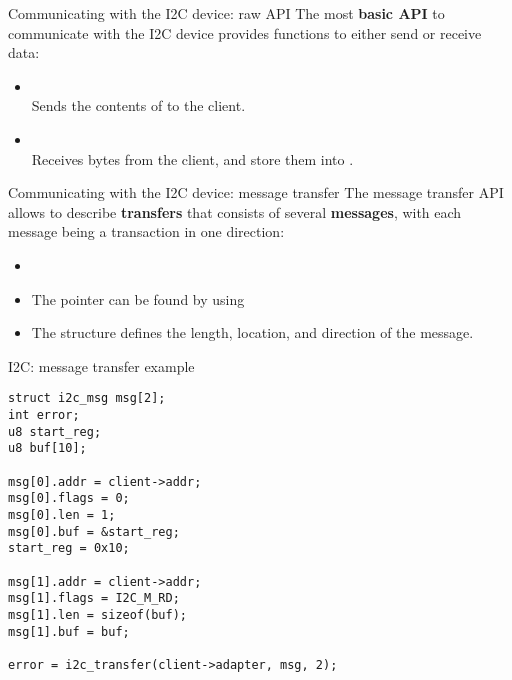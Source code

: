 \begin{frame}{Communicating with the I2C device: raw API}
  The most {\bf basic API} to communicate with the I2C device provides
  functions to either send or receive data:
  \begin{itemize}
  \item
    \\Sends
    the contents of  to the client.
  \item
    \\Receives
     bytes from the client, and store them into
    .
  \end{itemize}
\end{frame}

\begin{frame}{Communicating with the I2C device: message transfer}
  The message transfer API allows to describe {\bf transfers} that
  consists of several {\bf messages}, with each message being a
  transaction in one direction:
  \begin{itemize}
  \item
  \item The  pointer can be found by using
  \item The  structure defines the length, location, and
    direction of the message.
  \end{itemize}
\end{frame}

\begin{frame}[fragile]{I2C: message transfer example}
\begin{block}{}
  \begin{verbatim}
struct i2c_msg msg[2];
int error;
u8 start_reg;
u8 buf[10];

msg[0].addr = client->addr;
msg[0].flags = 0;
msg[0].len = 1;
msg[0].buf = &start_reg;
start_reg = 0x10;

msg[1].addr = client->addr;
msg[1].flags = I2C_M_RD;
msg[1].len = sizeof(buf);
msg[1].buf = buf;

error = i2c_transfer(client->adapter, msg, 2);
\end{verbatim}
\end{block}
\end{frame}

